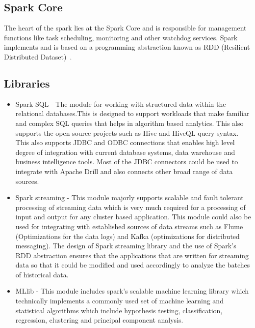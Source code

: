 \subsection{Spark Core}

The heart of the spark lies at the Spark Core and is responsible for management 
functions like task scheduling, monitoring and other watchdog services. 
Spark implements and is based on a programming abstraction known as 
RDD (Resilient Distributed Dataset)~\cite{hid-sp18-410-spark-architecture}.

\subsection{Libraries}

\begin{itemize}

\item Spark SQL - The module for working with structured data within the relational 
databases.This is designed to support workloads that make familiar and complex 
SQL queries that helps in algorithm based analytics. This also supports the open
 source projects such as Hive and HiveQL query syntax. This also supports JDBC 
 and ODBC connections that enables high level degree of integration with current
  database systems, data warehouse and business intelligence tools. Most of the 
  JDBC connectors could be used to integrate with Apache Drill and also connects
   other broad range of data sources.

\item Spark streaming - This module majorly supports scalable and fault tolerant 
processing of streaming data which is very much required for a processing of 
input and output for any cluster based application. This module could also be 
used for integrating with established sources of data streams such as Flume 
(Optimizations for the data logs) and Kafka (optimizations for distributed 
messaging). The design of Spark streaming library and the use of Spark’s RDD 
abstraction ensures that the applications that are written for streaming data 
so that it could be modified and used accordingly to analyze the batches of 
historical data.

\item MLlib - This module includes spark’s scalable machine learning library which 
technically implements a commonly used set of machine learning and statistical 
algorithms which include hypothesis testing, classification, regression, 
clustering and principal component analysis.


\end{itemize}
